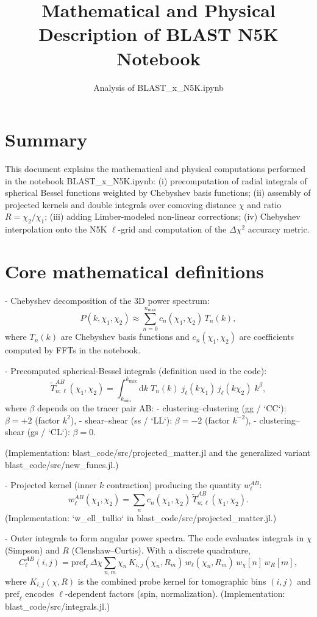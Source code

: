 \documentclass{article}
\title{Mathematical and Physical Description of BLAST N5K Notebook}
\author{Analysis of BLAST_x_N5K.ipynb}
\begin{document}
\maketitle

\section*{Summary}
This document explains the mathematical and physical computations performed in the notebook BLAST_x_N5K.ipynb: (i) precomputation of radial integrals of spherical Bessel functions weighted by Chebyshev basis functions; (ii) assembly of projected kernels and double integrals over comoving distance $\chi$ and ratio $R=\chi_2/\chi_1$; (iii) adding Limber-modeled non-linear corrections; (iv) Chebyshev interpolation onto the N5K $\ell$-grid and computation of the $\Delta\chi^2$ accuracy metric.

\section*{Core mathematical definitions}
- Chebyshev decomposition of the 3D power spectrum:
$$
P(k,\chi_1,\chi_2)\approx\sum_{n=0}^{n_{\max}} c_n(\chi_1,\chi_2)\,T_n(k),
$$
where $T_n(k)$ are Chebyshev basis functions and $c_n(\chi_1,\chi_2)$ are coefficients computed by FFTs in the notebook.

- Precomputed spherical-Bessel integrals (definition used in the code):
$$
\tilde T_{n;\ell}^{AB}(\chi_1,\chi_2)=
\int_{k_{\min}}^{k_{\max}} \mathrm{d}k\; T_n(k)\; j_\ell(k\chi_1)\, j_\ell(k\chi_2)\; k^\beta,
$$
where $\beta$ depends on the tracer pair AB:
- clustering–clustering (gg / `CC`): $\beta=+2$ (factor $k^2$),
- shear–shear (ss / `LL`): $\beta=-2$ (factor $k^{-2}$),
- clustering–shear (gs / `CL`): $\beta=0$.

(Implementation: blast_code/src/projected_matter.jl and the generalized variant blast_code/src/new_funcs.jl.)

- Projected kernel (inner $k$ contraction) producing the quantity $w_\ell^{AB}$:
$$
w_{\ell}^{AB}(\chi_1,\chi_2)=\sum_{n} c_n(\chi_1,\chi_2)\,\tilde T_{n;\ell}^{AB}(\chi_1,\chi_2).
$$
(Implementation: `w_ell_tullio` in blast_code/src/projected_matter.jl.)

- Outer integrals to form angular power spectra. The code evaluates integrals in $\chi$ (Simpson) and $R$ (Clenshaw–Curtis). With a discrete quadrature,
$$
C_\ell^{AB}(i,j)=\mathrm{pref}_\ell \,\Delta\chi\sum_{n,m}\chi_n\,K_{i,j}( \chi_n,R_m)\,w_{\ell}(\chi_n,R_m)\,w_\chi[n]\,w_R[m],
$$
where $K_{i,j}(\chi,R)$ is the combined probe kernel for tomographic bins $(i,j)$ and $\mathrm{pref}_\ell$ encodes $\ell$-dependent factors (spin, normalization). (Implementation: blast_code/src/integrals.jl.)
\end{document}
